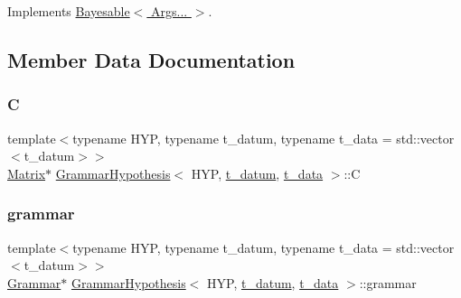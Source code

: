 Implements \hyperlink{class_bayesable_a2ec58e98bf37a90ac3d45a7713c6d5ea}{Bayesable$<$ Args... $>$}.



\subsection{Member Data Documentation}
\mbox{\label{class_grammar_hypothesis_a2147efc4d1268e115803bd34f63f1c35}} 
\subsubsection{\texorpdfstring{C}{C}}
{\footnotesize\ttfamily template$<$typename H\+YP, typename t\+\_\+datum, typename t\+\_\+data = std\+::vector$<$t\+\_\+datum$>$$>$ \\
\hyperlink{_eigen_numerics_8h_a645222978e81acfb2523a9bce34aecc0}{Matrix}$\ast$ \hyperlink{class_grammar_hypothesis}{Grammar\+Hypothesis}$<$ H\+YP, \hyperlink{class_bayesable_a7c93a2eeab708378eb321745908718d4}{t\+\_\+datum}, \hyperlink{class_bayesable_a70a593a67c7d43239ecc06bb4fd06a6b}{t\+\_\+data} $>$\+::C}

\mbox{\label{class_grammar_hypothesis_ae3aa5981689e75e3eccc343c838b8f47}} 
\subsubsection{\texorpdfstring{grammar}{grammar}}
{\footnotesize\ttfamily template$<$typename H\+YP, typename t\+\_\+datum, typename t\+\_\+data = std\+::vector$<$t\+\_\+datum$>$$>$ \\
\hyperlink{class_grammar}{Grammar}$\ast$ \hyperlink{class_grammar_hypothesis}{Grammar\+Hypothesis}$<$ H\+YP, \hyperlink{class_bayesable_a7c93a2eeab708378eb321745908718d4}{t\+\_\+datum}, \hyperlink{class_bayesable_a70a593a67c7d43239ecc06bb4fd06a6b}{t\+\_\+data} $>$\+::grammar}

\mbox{\label{class_grammar_hypothesis_a90aea1a98b122b01e7a10cc2c7c251d4}} 
